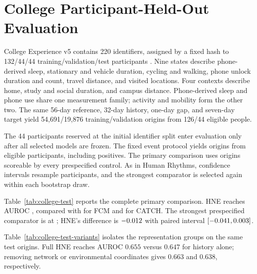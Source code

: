 \section{College Participant-Held-Out Evaluation}
\label{app:college-test}


College Experience v5 contains 220 identifiers, assigned by a fixed hash to 132/44/44 training/validation/test participants \citep{hneD08}. Nine states describe phone-derived sleep, stationary and vehicle duration, cycling and walking, phone unlock duration and count, travel distance, and visited locations. Four contexts describe home, study and social duration, and campus distance. Phone-derived sleep and phone use share one measurement family; activity and mobility form the other two. The same 56-day reference, 32-day history, one-day gap, and seven-day target yield 54,691/19,876 training/validation origins from 126/44 eligible people.

The 44 participants reserved at the initial identifier split enter evaluation only after all selected models are frozen. The fixed event protocol yields \CollegeAllN{} origins from \CollegePeople{} eligible participants, including \CollegePositive{} positives. The primary comparison uses \CollegeN{} origins scoreable by every prespecified control. As in Human Rhythms, confidence intervals resample participants, and the strongest comparator is selected again within each bootstrap draw.

\begin{table}[!htb]
\centering
\caption{College prediction on 14,963 common test origins. Within is mean within-participant AUROC; TPR/FPR use validation-selected thresholds.}
\label{tab:college-test}
\end{table}

Table~\ref{tab:college-test} reports the complete primary comparison. HNE reaches AUROC \CollegeHNE{}, compared with \CollegeFCM{} for FCM and \CollegeCATCH{} for CATCH. The strongest prespecified comparator is \CollegeBestName{} at \CollegeBestAUC{}; HNE's difference is $-0.012$ with paired interval $[-0.041,0.003]$.

\FloatBarrier
Table~\ref{tab:college-test-variants} isolates the representation groups on the same test origins. Full HNE reaches AUROC $0.655$ versus $0.647$ for history alone; removing network or environmental coordinates gives $0.663$ and $0.638$, respectively.

\begin{table}[!htb]
\centering
\caption{College representation ablations on the common test population.}
\label{tab:college-test-variants}
\end{table}


